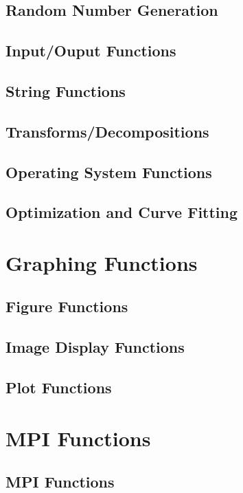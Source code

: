 \documentclass{book}
\begin{document}
\section{Random Number Generation}

\section{Input/Ouput Functions}

\section{String Functions}

\section{Transforms/Decompositions}

\section{Operating System Functions}

\section{Optimization and Curve Fitting}

\chapter{Graphing Functions}
\section{Figure Functions}

\section{Image Display Functions}

\section{Plot Functions}

\chapter{MPI Functions}
\section{MPI Functions}

\end{document}
